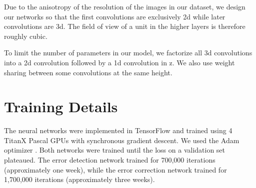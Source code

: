 \documentclass{article}
\begin{document}
\begin{appendices}
Due to the anisotropy of the resolution of the images in our dataset, we design our networks so that the first convolutions are exclusively 2d while later convolutions are 3d. The field of view of a unit in the higher layers is therefore roughly cubic.


To limit the number of parameters in our model, we factorize all 3d convolutions into a 2d convolution followed by a 1d convolution in z. We also use weight sharing between some convolutions at the same height.

\section{Training Details}
The neural networks were implemented in TensorFlow \cite{tensorflow} and trained using 4 TitanX Pascal GPUs with synchronous gradient descent. We used the Adam optimizer \cite{adam}.   Both networks were trained until the loss on a validation set plateaued. The error detection network trained for 700,000 iterations (approximately one week), while the error correction network trained for 1,700,000 iterations (approximately three weeks).
\end{appendices}
\end{document}
